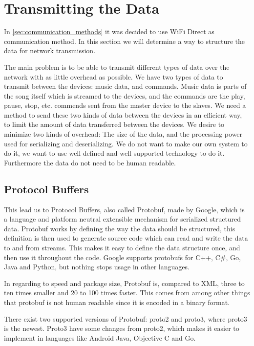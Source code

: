 \section{Transmitting the Data}
In \cref{sec:communication_methods} it was decided to use WiFi Direct as communication method.
In this section we will determine a way to structure the data for network transmission.

\bigskip
The main problem is to be able to transmit different types of data over the network with as little overhead as possible.
We have two types of data to transmit between the devices: music data, and commands. 
Music data is parts of the song itself which is streamed to the devices,
and the commands are the play, pause, stop, etc. commends sent from the master device to the slaves. 
We need a method to send these two kinds of data between the devices in an efficient way,
to limit the amount of data transferred between the devices.
We desire to minimize two kinds of overhead: The size of the data, and the processing power used for serializing and deserializing. 
We do not want to make our own system to do it, we want to use well defined and well supported technology to do it.
Furthermore the data do not need to be human readable.

\subsection{Protocol Buffers}
This lead us to Protocol Buffers, also called Protobuf, made by Google, which is a language and platform neutral extensible mechanism for serialized structured data. 
Protobuf works by defining the way the data should be structured, this definition is then used to generate source code which can read and write the data to and from streams.\cite{protobuf}
This makes it easy to define the data structure once, and then use it throughout the code.
Google supports protobufs for C++, C\#, Go, Java and Python, but nothing stops usage in other languages\cite{protobuf}.

In regarding to speed and package size, Protobuf is, compared to XML, three to ten times smaller and 20 to 100 times faster.
This comes from among other things that protobuf is not human readable since it is encoded in a binary format.\cite{protobuf} 

There exist two supported versions of Protobuf: proto2 and proto3, where proto3 is the newest.
Proto3 have some changes from proto2, which makes it easier to implement in languages like Android Java, Objective C and Go.\cite{proto3}

